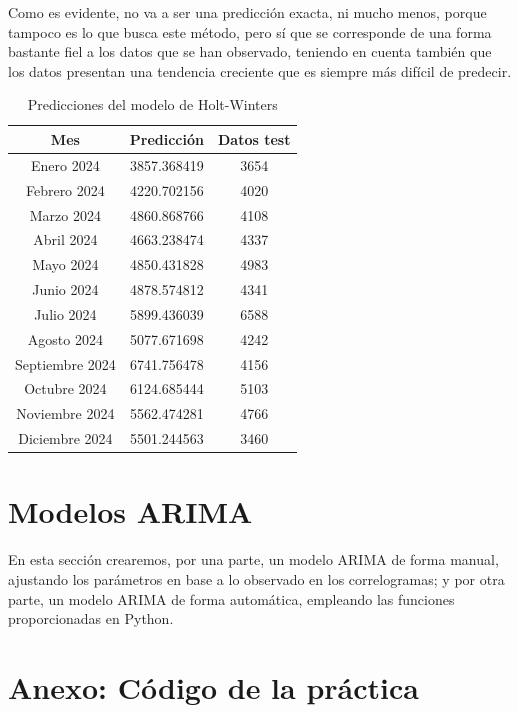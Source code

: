 \documentclass[a4paper,onecolumn]{extarticle}
\let\stdsection\section
\renewcommand\section{\newpage\stdsection}
\begin{document}
\begin{sloppypar}
Como es evidente, no va a ser una predicción exacta, ni mucho menos, porque tampoco es lo que busca 
este método, pero sí que se corresponde de una forma bastante fiel a los datos que se han observado, teniendo en cuenta también que los datos presentan una 
tendencia creciente que es siempre más difícil de predecir. 
\begin{table}[h!]
    \begin{center}
        \begin{tabular}{|c|c|c|}
            \hline
            \textbf{Mes} & \textbf{Predicción} & \textbf{Datos test} \\
            \hline
            Enero 2024         & 3857.368419 & 3654 \\
            Febrero 2024       & 4220.702156 & 4020 \\
            Marzo 2024         & 4860.868766 & 4108 \\
            Abril 2024         & 4663.238474 & 4337 \\
            Mayo 2024          & 4850.431828 & 4983 \\
            Junio 2024         & 4878.574812 & 4341 \\
            Julio 2024         & 5899.436039 & 6588 \\
            Agosto 2024        & 5077.671698 & 4242 \\
            Septiembre 2024    & 6741.756478 & 4156 \\
            Octubre 2024       & 6124.685444 & 5103 \\
            Noviembre 2024     & 5562.474281 & 4766 \\
            Diciembre 2024     & 5501.244563 & 3460 \\
            \hline
        \end{tabular}
        \caption{Predicciones del modelo de Holt-Winters}
        \label{tab:prediccionesHoltWinter}
    \end{center}
\end{table}

\section{Modelos ARIMA}
En esta sección crearemos, por una parte, un modelo ARIMA de forma manual, ajustando los parámetros en base a lo observado en los correlogramas; y por otra 
parte, un modelo ARIMA de forma automática, empleando las funciones proporcionadas en Python.

\newpage

\appendix
\section{Anexo: Código de la práctica}\label{anexo1}

\end{sloppypar}
\end{document}
